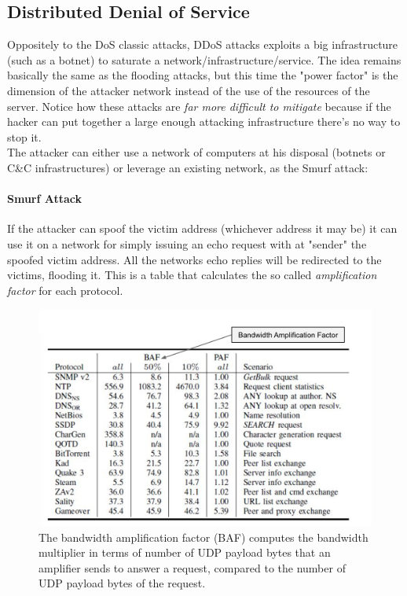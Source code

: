 \documentclass{article}
\begin{document}
			\subsection{Distributed Denial of Service}
				Oppositely to the DoS classic attacks, DDoS attacks exploits a big infrastructure (such as a botnet) to saturate a network/infrastructure/service. The idea remains basically the same as the flooding attacks, but this time the "power factor" is the dimension of the attacker network instead of the use of the resources of the server. Notice how these attacks are \emph{far more difficult to mitigate} because if the hacker can put together a large enough attacking infrastructure there's no way to stop it.\\
				The attacker can either use a network of computers at his disposal (botnets or C\&C infrastructures) or leverage an existing network, as the Smurf attack:
				
				\paragraph{Smurf Attack}
					If the attacker can spoof the victim address (whichever address it may be) it can use it on a network for simply issuing an echo request with at "sender" the spoofed victim address. All the networks echo replies will be redirected to the victims, flooding it. This is a table that calculates the so called \emph{amplification factor} for each protocol.
					\begin{figure}[H]
						\centering
						\includegraphics[width = \textwidth]{./images/SmurfAttack.png}
						\caption{The bandwidth amplification factor (BAF) computes the bandwidth multiplier in terms of number of UDP payload bytes that an amplifier sends to answer a request, compared to the number of UDP payload bytes of the request.}
					\end{figure}
					
\end{document}
